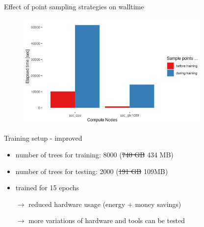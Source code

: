 \documentclass[compress,aspectratio=169]{beamer}
\begin{document}
\begin{frame}{Effect of point sampling strategies on walltime}
    \vspace{-1em}
    \begin{center}
    \begin{figure}
        \includegraphics[width=0.85\textwidth]{./assets/sacct_barplot_by_nodes_sample-points-effect}
    \end{figure}
    \end{center}
\end{frame}

\begin{frame}{Training setup - improved}
\begin{itemize}
    \item number of trees for training: 8000 (\sout{740 GB} 434 MB)
    \vspace{1em}
    \item number of trees for testing: 2000 (\sout{191 GB} 109MB)
    \vspace{1em}
    \item trained for 15 epochs
    \vspace{2em}
    \hline
    \vspace{2em}
    \item[$\rightarrow$] reduced hardware usage (energy + money savings)
    \item[$\rightarrow$] more variations of hardware and tools can be tested
\end{itemize}
\end{frame}
\end{document}
